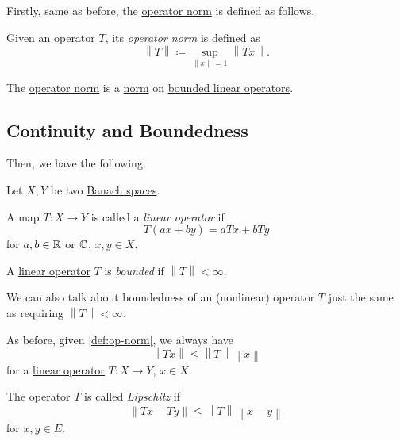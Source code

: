 Firstly, same as before, the \hyperref[def:op-norm]{operator norm} is defined as follows.

\begin{definition}\label{def:op-norm}
	Given an operator \(T\), its \emph{operator norm} is defined as
	\[
		\left\lVert T\right\rVert \coloneqq \sup _{\left\lVert x\right\rVert = 1} \left\lVert Tx\right\rVert.
	\]
\end{definition}

\begin{remark}
	The \hyperref[def:op-norm]{operator norm} is a \hyperref[def:norm]{norm} on \hyperref[def:bounded-linear-op]{bounded linear operators}.
\end{remark}

\subsection{Continuity and Boundedness}
Then, we have the following.
\begin{definition*}
	Let \(X, Y\) be two \hyperref[def:Banach-space]{Banach spaces}.
	\begin{definition}\label{def:linear-op}
		A map \(T\colon X\to Y\) is called a \emph{linear operator} if
		\[
			T(ax + by) = aTx + bTy
		\]
		for \(a, b\in \mathbb{\MakeUppercase{r}} \) or \(\mathbb{\MakeUppercase{c}} \), \(x, y\in X\).
	\end{definition}
	\begin{definition}\label{def:bounded-linear-op}
		A \hyperref[def:linear-op]{linear operator} \(T\) is \emph{bounded} if \(\left\lVert T\right\rVert < \infty \).
	\end{definition}
\end{definition*}

\begin{remark}
	We can also talk about boundedness of an (nonlinear) operator \(T\) just the same as requiring \(\left\lVert T\right\rVert < \infty \).
\end{remark}

As before, given \autoref{def:op-norm}, we always have
\[
	\left\lVert Tx\right\rVert \leq \left\lVert T\right\rVert \left\lVert x\right\rVert
\]
for a \hyperref[def:linear-op]{linear operator} \(T\colon X\to Y\), \(x\in X\).

\begin{definition}[Lipschitz]\label{def:Lipschitz}
	The operator \(T\) is called \emph{Lipschitz} if
	\[
		\left\lVert Tx - Ty\right\rVert \leq \left\lVert T\right\rVert \left\lVert x - y\right\rVert
	\]
	for \(x, y\in E\).
\end{definition}

